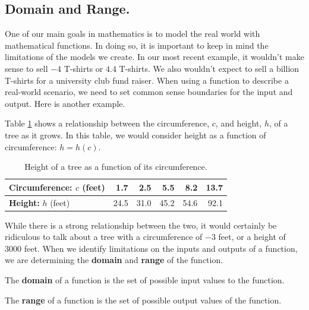 \subsection{Domain and Range.}

One of our main goals in mathematics is to model the real world with mathematical functions. In doing so, it is important to keep in mind the limitations of the models we create. In our most recent example, it wouldn't make sense to sell $-4$ T-shirts or $4.4$ T-shirts. We also wouldn't expect to sell a billion T-shirts for a university club fund raiser. When using a function to describe a real-world scenario, we need to set common sense boundaries for the input and output. Here is another example.

Table \ref{tab:1-tree} shows a relationship between the circumference, $c$, and height, $h$, of a tree as it grows. In this table, we would consider height as a function of circumference: $h = h(c)$.

\begin{table}[ht!]
\begin{centering}
\begin{tabular}{l*{5}{r}}
\toprule
{\bf Circumference:} $c$ (feet) & 1.7 & 2.5 & 5.5 & 8.2 & 13.7\tabularnewline
\midrule
{\bf Height:} $h$ (feet) & 24.5 & 31.0 & 45.2 & 54.6 & 92.1\tabularnewline
\bottomrule
\end{tabular}
\caption{Height of a tree as a function of its circumference.}
\label{tab:1-tree}
\end{centering}
\end{table}
While there is a strong relationship between the two, it would certainly
be ridiculous to talk about a tree with a circumference of $-3$ feet, or a
height of $3000$ feet. When we identify limitations on the inputs and
outputs of a function, we are determining the {\bf domain} and {\bf range} of the function.

\begin{definition}
The {\bf domain} of a function is the set of possible input values to the function.

The {\bf range} of a function is the set of possible output values of the function.
\end{definition}

